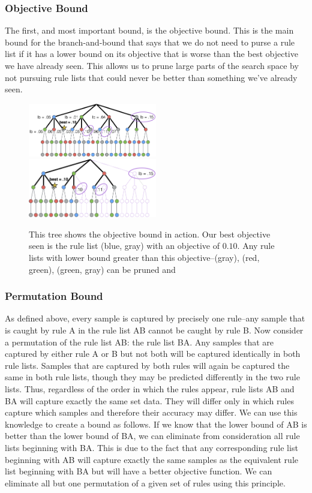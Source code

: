 \subsubsection{Objective Bound}
The first, and most important bound, is the objective bound.
This is the main bound for the branch-and-bound that says that we do not need to purse a rule list if it has a lower bound on its objective that is worse than the best objective we have already seen.
This allows us to prune large parts of the search space by not pursuing rule lists that could never be better than something we've already seen.

\begin{figure}
\includegraphics[width=0.5\textwidth]{figs/ela_branch-and-bound-tree.png}
\includegraphics[width=0.5\textwidth]{figs/ela_branch-and-bound-tree-pruned.png}
\caption[Objective bound]{This tree shows the objective bound in action. Our best objective seen is the rule list (blue, gray) with an objective of $0.10$. Any rule lists with lower bound greater than this objective--(gray), (red, green), (green, gray) can be pruned and
\label{fig:objective-bound}}
\end{figure}

\subsubsection{Permutation Bound}

As defined above, every sample is captured by precisely one rule--any sample that is caught by rule A in the rule list AB cannot be caught by rule B. 
Now consider a permutation of the rule list AB: the rule list BA.
Any samples that are captured by either rule A or B but not both will be captured identically in both rule lists.
Samples that are captured by both rules will again be captured the same in both rule lists, though they may be predicted differently in the two rule lists.
Thus, regardless of the order in which the rules appear, rule lists AB and BA will capture exactly the same set data.
They will differ only in which rules capture which samples and therefore their accuracy may differ. 
We can use this knowledge to create a bound as follows.
If we know that the lower bound of AB is better than the lower bound of BA, we can eliminate from consideration all rule lists beginning with BA.
This is due to the fact that any corresponding rule list beginning with AB will capture exactly the same samples as the equivalent rule list beginning with BA but will have a better objective function.
We can eliminate all but one permutation of a given set of rules using this principle.

